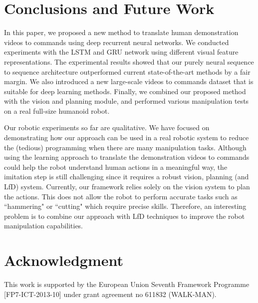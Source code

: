 \section{Conclusions and Future Work}\label{Sec:con}
In this paper, we proposed a new method to translate human demonstration videos to commands using deep recurrent neural networks. We conducted experiments with the LSTM and GRU network using different visual feature representations. The experimental results showed that our purely neural sequence to sequence architecture outperformed current state-of-the-art methods by a fair margin. We also introduced a new large-scale videos to commands dataset that is suitable for deep learning methods. Finally, we combined our proposed method with the vision and planning module, and performed various manipulation tests on a real full-size humanoid robot.

Our robotic experiments so far are qualitative. We have focused on demonstrating how our approach can be used in a real robotic system to reduce the (tedious) programming when there are many manipulation tasks. Although using the learning approach to translate the demonstration videos to commands could help the robot understand human actions in a meaningful way, the imitation step is still challenging since it requires a robust vision, planning (and LfD) system. Currently, our framework relies solely on the vision system to plan the actions. This does not allow the robot to perform accurate tasks such as ``hammering" or ``cutting" which require precise skills. Therefore, an interesting problem is to combine our approach with LfD techniques to improve the robot manipulation capabilities.


\section*{Acknowledgment}
This work is supported by the European Union Seventh Framework Programme [FP7-ICT-2013-10] under grant agreement no 611832 (WALK-MAN). 

